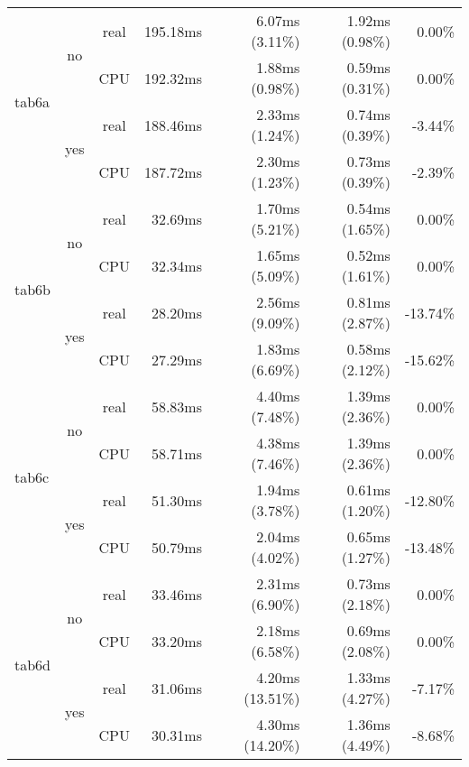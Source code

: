 \documentclass[en]{pracamgr}
\begin{document}
\begin{small}
\begin{longtable}{|l|c|c|r|r|r|r|}
\hline
\multirow{4}{*}{tab6a}    & \multirow{2}{*}{no}  & real & 195.18ms & 6.07ms (3.11\%) & 1.92ms (0.98\%) & 0.00\% \\*
                          &                      & CPU  & 192.32ms & 1.88ms (0.98\%) & 0.59ms (0.31\%) & 0.00\% \\*
                          \cline{2-7}
                          & \multirow{2}{*}{yes} & real & 188.46ms & 2.33ms (1.24\%) & 0.74ms (0.39\%) & -3.44\% \\*
                          &                      & CPU  & 187.72ms & 2.30ms (1.23\%) & 0.73ms (0.39\%) & -2.39\% \\
\hline
\multirow{4}{*}{tab6b}    & \multirow{2}{*}{no}  & real & 32.69ms & 1.70ms (5.21\%) & 0.54ms (1.65\%) & 0.00\% \\*
                          &                      & CPU  & 32.34ms & 1.65ms (5.09\%) & 0.52ms (1.61\%) & 0.00\% \\*
                          \cline{2-7}
                          & \multirow{2}{*}{yes} & real & 28.20ms & 2.56ms (9.09\%) & 0.81ms (2.87\%) & -13.74\% \\*
                          &                      & CPU  & 27.29ms & 1.83ms (6.69\%) & 0.58ms (2.12\%) & -15.62\% \\
\hline
\multirow{4}{*}{tab6c}    & \multirow{2}{*}{no}  & real & 58.83ms & 4.40ms (7.48\%) & 1.39ms (2.36\%) & 0.00\% \\*
                          &                      & CPU  & 58.71ms & 4.38ms (7.46\%) & 1.39ms (2.36\%) & 0.00\% \\*
                          \cline{2-7}
                          & \multirow{2}{*}{yes} & real & 51.30ms & 1.94ms (3.78\%) & 0.61ms (1.20\%) & -12.80\% \\*
                          &                      & CPU  & 50.79ms & 2.04ms (4.02\%) & 0.65ms (1.27\%) & -13.48\% \\
\hline
\multirow{4}{*}{tab6d}    & \multirow{2}{*}{no}  & real & 33.46ms & 2.31ms (6.90\%) & 0.73ms (2.18\%) & 0.00\% \\*
                          &                      & CPU  & 33.20ms & 2.18ms (6.58\%) & 0.69ms (2.08\%) & 0.00\% \\*
                          \cline{2-7}
                          & \multirow{2}{*}{yes} & real & 31.06ms & 4.20ms (13.51\%) & 1.33ms (4.27\%) & -7.17\% \\*
                          &                      & CPU  & 30.31ms & 4.30ms (14.20\%) & 1.36ms (4.49\%) & -8.68\% \\

\end{longtable}
\end{small}
\end{document}
